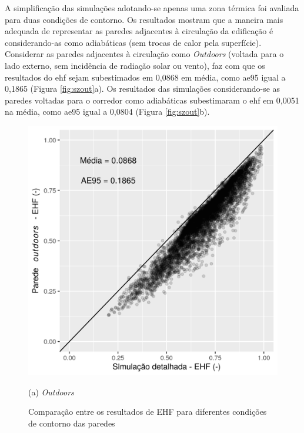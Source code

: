 \documentclass[brazil,hardcopy,openany]{ufscthesis} %
\begin{document}
A simplificação das simulações adotando-se apenas uma zona térmica foi avaliada para duas condições de contorno. Os resultados mostram que a maneira mais adequada de representar as paredes adjacentes à circulação da edificação é considerando-as como adiabáticas (sem trocas de calor pela superfície).
Considerar as paredes adjacentes à circulação como \textit{Outdoors} (voltada para o lado externo, sem incidência de radiação solar ou vento), faz com que os resultados do \acrshort{ehf} sejam subestimados em 0,0868 em média, como \acrshort{ae95} igual a 0,1865 (Figura \ref{fig:szout}a).
Os resultados das simulações considerando-se as paredes voltadas para o corredor como adiabáticas subestimaram o \acrshort{ehf} em 0,0051 na média, como \acrshort{ae95} igual a 0,0804 (Figura \ref{fig:szout}b).

\begin{figure}[h]
	\caption{Comparação entre os resultados de EHF para diferentes condições de contorno das paredes}
	\begin{minipage}{.5\textwidth}
		\includegraphics[width=\linewidth]{img/szout_EHF_scatter.png}
		\begin{center}
			\small{(a) \textit{Outdoors}}
		\end{center}
	\end{minipage}%
	\begin{minipage}{.5\textwidth}

\end{minipage}
\end{figure}
\end{document}
